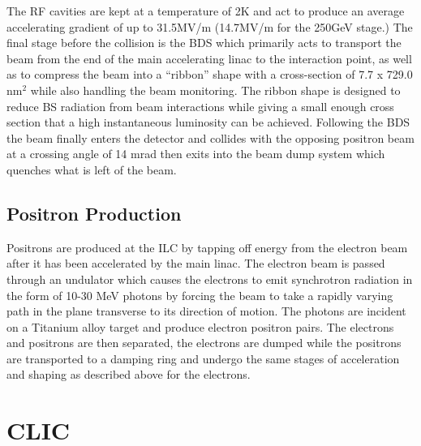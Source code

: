 The \ac{RF} cavities are kept at a temperature of 2K and act to produce an average accelerating gradient of up to 31.5MV/m (14.7MV/m for the 250GeV stage.)  The final stage before the collision is the \ac{BDS} which primarily acts to transport the beam from the end of the main accelerating linac to the interaction point, as well as to compress the beam into a ``ribbon'' shape with a cross-section of 7.7 x 729.0 nm$^2$ while also handling the beam monitoring. The ribbon shape is designed to reduce \ac{BS} radiation from beam interactions while giving a small enough cross section that a high instantaneous luminosity can be achieved. Following the \ac{BDS} the beam finally enters the detector and collides with the opposing positron beam at a crossing angle of 14 mrad then exits into the beam dump system which quenches what is left of the beam.

\subsection{Positron Production}
Positrons are produced at the \ac{ILC} by tapping off energy from the electron beam after it has been accelerated by the main linac. The electron beam is passed through an undulator which causes the electrons to emit synchrotron radiation in the form of 10-30 MeV photons by forcing the beam to take a rapidly varying path in the plane transverse to its direction of motion. The photons are incident on a Titanium alloy target and produce electron positron pairs. The electrons and positrons are then separated, the electrons are dumped while the positrons are transported to a damping ring and undergo the same stages of acceleration and shaping as described above for the electrons.

\section{CLIC}

